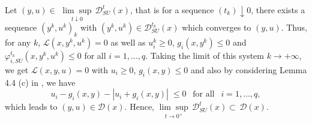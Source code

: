 Let $(y,u)\in$ $\underset{t\downarrow0}{\lim\sup}\,\mathcal{D}^{t}_{SU}(x)$, that is 
	for a sequence $(t_{k})\downarrow0$, there exists a sequence $(y^{k}
	,u^{k})_{k}$ with $(y^{k},u^{k})\in\mathcal{D}^{t_{k}}_{SU}(x)$ which converges
	to $(y,u)$. Thus, for any $k$,  $\mathcal{L}(x,y^{k},u^{k})=0$ as well as 
	$u_{i}^{k}\geq 0$, $g_{i}(x,y^{k})\leq0$ and $\varphi_{i,SU}^{t_k}(x,y^{k},u^{k})\leq 0$ for all $i=1,\ldots,q$.
		Taking the limit of this system $k\rightarrow +\infty$, we get $\mathcal{L}(x,y,u)=0$ with  $u_{i}\geq 0$, $g_{i}(x,y) \leq 0$ and also by considering Lemma 4.4 (c) in \cite{Hoheisel2010}, we have %
\[
 u_{i}-g_{i}(x,y)-\left\vert u_{i}+g_{i}(x,y)\right\vert  \; \leq 0 \;\,\mbox{ for all } \;\,i=1,\ldots,q,
 \]
  which leads to $(y,u)\in\mathcal{D}(x)$. Hence,  $\underset
	{t\rightarrow0^{+}}{\lim\sup}\,\mathcal{D}^{t}_{SU}(x)\subset\,\mathcal{D}(x).$
